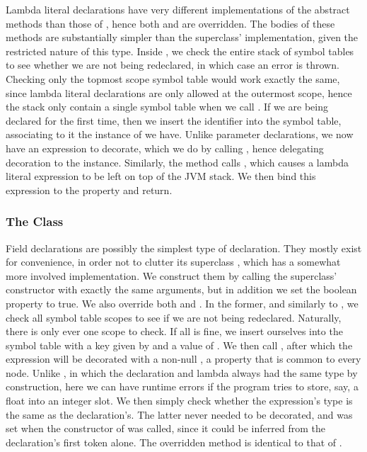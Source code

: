 Lambda literal declarations have very different implementations of the  abstract methods than those of , hence both  and  are overridden. The bodies of these methods are substantially simpler than the superclass' implementation, given the restricted nature of this type. Inside , we check the entire stack of symbol tables to see whether we are not being redeclared, in which case an error is thrown. Checking only the topmost scope symbol table would work exactly the same, since lambda literal declarations are only allowed at the outermost scope, hence the stack only contain a single symbol table when we call . If we are being declared for the first time, then we insert the identifier into the symbol table, associating to it the instance of  we have. Unlike parameter declarations, we now have an expression to decorate, which we do by calling , hence delegating decoration to the  instance. Similarly, the  method calls , which causes a lambda literal expression to be left on top of the JVM stack. We then bind this expression to the  property and return.

\subsubsection{The  Class}

Field declarations are possibly the simplest type of declaration. They mostly exist for convenience, in order not to clutter its superclass , which has a somewhat more involved implementation. We construct them by calling the superclass' constructor with exactly the same arguments, but in addition we set the  boolean property to true. We also override both  and . In the former, and similarly to , we check all symbol table scopes to see if we are not being redeclared. Naturally, there is only ever one scope to check. If all is fine, we insert ourselves into the symbol table with a key given by  and a value of . We then call , after which the expression will be decorated with a non-null , a property that is common to every node. Unlike , in which the declaration and lambda always had the same type by construction, here we can have runtime errors if the program tries to store, say, a float into an integer slot. We then simply check whether the expression's type is the same as the declaration's. The latter never needed to be decorated, and was set when the constructor of  was called, since it could be inferred from the declaration's first token alone. The overridden  method is identical to that of .

